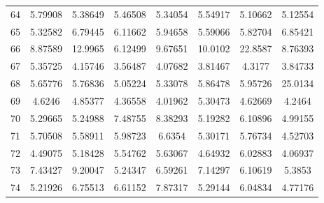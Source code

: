 \begin{center}
\begin{longtable}{cccccccc}
64 & 5.79908 & 5.38649 & 5.46508 & 5.34054 & 5.54917 & 5.10662 & 5.12554\\
65 & 5.32582 & 6.79445 & 6.11662 & 5.94658 & 5.59066 & 5.82704 & 6.85421\\
66 & 8.87589 & 12.9965 & 6.12499 & 9.67651 & 10.0102 & 22.8587 & 8.76393\\
67 & 5.35725 & 4.15746 & 3.56487 & 4.07682 & 3.81467 & 4.3177 & 3.84733\\
68 & 5.65776 & 5.76836 & 5.05224 & 5.33078 & 5.86478 & 5.95726 & 25.0134\\
69 & 4.6246 & 4.85377 & 4.36558 & 4.01962 & 5.30473 & 4.62669 & 4.2464\\
70 & 5.29665 & 5.24988 & 7.48755 & 8.38293 & 5.19282 & 6.10896 & 4.99155\\
71 & 5.70508 & 5.58911 & 5.98723 & 6.6354 & 5.30171 & 5.76734 & 4.52703\\
72 & 4.49075 & 5.18428 & 5.54762 & 5.63067 & 4.64932 & 6.02883 & 4.06937\\
73 & 7.43427 & 9.20047 & 5.24347 & 6.59261 & 7.14297 & 6.10619 & 5.3853\\
74 & 5.21926 & 6.75513 & 6.61152 & 7.87317 & 5.29144 & 6.04834 & 4.77176\\
\end{longtable}
\end{center} 



